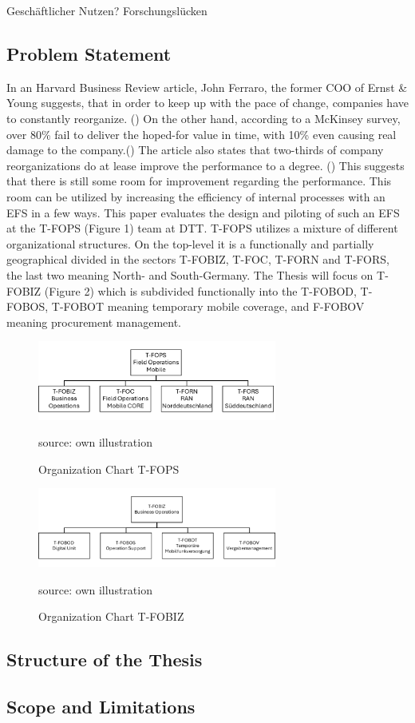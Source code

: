 Geschäftlicher Nutzen?
Forschungslücken


\subsection{Problem Statement}
In an Harvard Business Review article, John Ferraro, the former COO of Ernst \& Young suggests, that in order to keep up with the pace of change, companies have 
to constantly reorganize. (\cite{heidari-robinson_getting_2016}) On the other hand, according to a McKinsey survey, over 80\% fail to deliver the hoped-for value in time, with 10\% even causing real 
damage to the company.(\cite{heidari-robinson_getting_2016}) The article also states that two-thirds of company reorganizations do at lease improve the performance to a degree. (\cite{heidari-robinson_getting_2016}) This suggests that 
there is still some room for improvement regarding the performance. 
This room can be utilized by increasing the efficiency of internal processes with an \ac{EFS} in a few ways. 
This paper evaluates the design and piloting of such an \ac{EFS} at the \ac{T-FOPS} (Figure 1) team at \ac{DTT}. 
\ac{T-FOPS} utilizes a mixture of different organizational structures. On the top-level it is a functionally and partially geographical divided in the sectors 
\ac{T-FOBIZ}, \ac{T-FOC}, \ac{T-FORN} and \ac{T-FORS}, the last two meaning North- and 
South-Germany. The Thesis will focus on \ac{T-FOBIZ} (Figure 2) which is subdivided functionally into the \ac{T-FOBOD}, \ac{T-FOBOS}, 
\ac{T-FOBOT} meaning temporary mobile coverage, and \ac{F-FOBOV} meaning procurement management. 

\begin{figure}[H]
    \centering
    \includegraphics[width=0.7\textwidth]{abbildungen/FopsOrga}
    \caption{Organization Chart \ac{T-FOPS}}
    \label{fig:FopsOrga}
    source: own illustration
\end{figure}
\begin{figure}[H]
    \centering
    \includegraphics[width=0.7\textwidth]{abbildungen/FobizOrga}
    \caption{Organization Chart \ac{T-FOBIZ}}
    \label{fig:FobizOrga}
    source: own illustration
\end{figure}

\subsection{Structure of the Thesis}

\subsection{Scope and Limitations}

